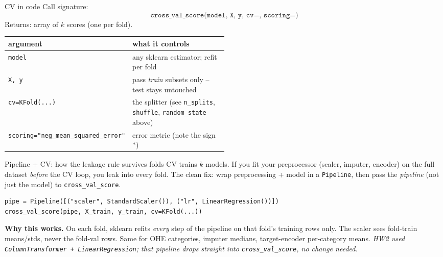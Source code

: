 \documentclass[aspectratio=169]{beamer}
\begin{document}
\begin{frame}{CV in code}
  Call signature:
  \[
    \texttt{cross\_val\_score(model, X, y, cv=, scoring=)}
  \]
  Returns: array of $k$ scores (one per fold).
  \vfill
  \begin{center}\small
    \renewcommand{\arraystretch}{1.4}
    \begin{tabular}{l p{0.5\linewidth}}
      \textbf{argument} & \textbf{what it controls} \\
      \hline
      \texttt{model} & any sklearn estimator; refit per fold \\
      \texttt{X, y} & pass \emph{train} subsets only -- test stays untouched \\
      \texttt{cv=KFold(...)} & the splitter (see \texttt{n\_splits}, \texttt{shuffle}, \texttt{random\_state} above) \\
      \texttt{scoring="neg\_mean\_squared\_error"} & error metric (note the sign $\ast$) \\
      \hline
    \end{tabular}
  \end{center}
  \vskip 4pt
\end{frame}

\begin{frame}[fragile]{Pipeline + CV: how the leakage rule survives folds}
  CV trains $k$ models. If you fit your preprocessor (scaler, imputer, encoder) on the full dataset \emph{before} the CV loop, you leak into every fold. The clean fix: wrap preprocessing + model in a \texttt{Pipeline}, then pass the \emph{pipeline} (not just the model) to \texttt{cross\_val\_score}.
  \vfill
{\lstset{basicstyle=\ttfamily\scriptsize}
\begin{lstlisting}
pipe = Pipeline([("scaler", StandardScaler()), ("lr", LinearRegression())])
cross_val_score(pipe, X_train, y_train, cv=KFold(...))
\end{lstlisting}}
  \vfill
  \textbf{Why this works.} On each fold, sklearn refits \emph{every} step of the pipeline on that fold's training rows only. The scaler sees fold-train means/stds, never the fold-val rows. Same for OHE categories, imputer medians, target-encoder per-category means.
  \vfill
  \footnotesize \emph{HW2 used \texttt{ColumnTransformer + LinearRegression}; that pipeline drops straight into \texttt{cross\_val\_score}, no change needed.}
\end{frame}
\end{document}
